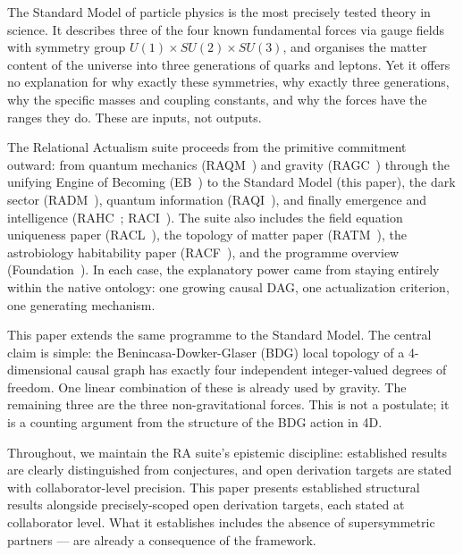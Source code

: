 \documentclass[11pt,a4paper]{article}
\begin{document}
The Standard Model of particle physics is the most precisely tested theory in
science. It describes three of the four known fundamental forces via gauge
fields with symmetry group $U(1) \times SU(2) \times SU(3)$, and organises
the matter content of the universe into three generations of quarks and leptons.
Yet it offers no explanation for why exactly these symmetries, why exactly three
generations, why the specific masses and coupling constants, and why the forces
have the ranges they do. These are inputs, not outputs.

The Relational Actualism suite proceeds from the primitive commitment outward:
from quantum mechanics (RAQM~\citep{Sandeman2026RAQM}) and gravity
(RAGC~\citep{Sandeman2026RAGC}) through the unifying Engine of Becoming
(EB~\citep{Sandeman2026RAEB}) to the Standard Model (this paper), the dark
sector (RADM~\citep{Sandeman2026RADM}), quantum information
(RAQI~\citep{Sandeman2026RAQI}), and finally emergence and intelligence
(RAHC~\citep{Sandeman2026RAHC}; RACI~\citep{Sandeman2026RACI}).
The suite also includes the field equation uniqueness paper
(RACL~\citep{Sandeman2026RACL}), the topology of matter paper
(RATM~\citep{Sandeman2026RATM}), the astrobiology habitability paper
(RACF~\citep{Sandeman2026RACF}), and the programme overview
(Foundation~\citep{Sandeman2026Foundation}).
In each case, the
explanatory power came from staying entirely within the native ontology: one
growing causal DAG, one actualization criterion, one generating mechanism.

This paper extends the same programme to the Standard Model. The central claim
is simple: the Benincasa-Dowker-Glaser (BDG) local topology of a 4-dimensional
causal graph has exactly four independent integer-valued degrees of freedom.
One linear combination of these is already used by gravity. The remaining
three are the three non-gravitational forces. This is not a postulate; it is
a counting argument from the structure of the BDG action in 4D.

Throughout, we maintain the RA suite's epistemic discipline: established results
are clearly distinguished from conjectures, and open derivation targets are
stated with collaborator-level precision. This paper presents established structural results alongside precisely-scoped
open derivation targets, each stated at collaborator level. What it establishes
includes the absence of supersymmetric
partners --- are already a consequence of the framework.

\end{document}
